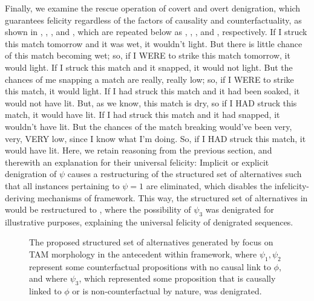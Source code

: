 Finally, we examine the rescue operation of covert and overt denigration, which guarantees felicity regardless of the factors of causality and counterfactuality, as shown in , , , and , which are repeated below as , , , and , respectively.
\pex
\a{}
    If I struck this match tomorrow and it was wet, it wouldn't light. But there is little chance of this match becoming wet; so, if I \MakeUppercase{were} to strike this match tomorrow, it would light.
\a{}If I struck this match and it snapped, it would not light. But the chances of me snapping a match are really, really low; so, if I \MakeUppercase{were} to strike this match, it would light.
\a{}If I had struck this match and it had been soaked, it would not have lit. But, as we know, this match is dry, so if I \MakeUppercase{had} struck this match, it would have lit.
\a{}If I had struck this match and it had snapped, it wouldn't have lit. But the chances of the match breaking would've been very, very, \MakeUppercase{very} low, since I know what I'm doing. So, if I \MakeUppercase{had} struck this match, it would have lit.
\xe
Here, we retain  reasoning from the previous section, and therewith an explanation for their universal felicity: Implicit or explicit denigration of $\psi$ causes a restructuring of the structured set of alternatives such that all instances pertaining to $\psi=1$ are eliminated, which disables the infelicity-deriving mechanisms of  framework. This way, the structured set of alternatives in  would be restructured to , where the possibility of $\psi_3$ was denigrated for illustrative purposes, explaining the universal felicity of denigrated sequences.
\begin{figure}[!htb]
    \centering
    
    \caption{The proposed structured set of alternatives generated by focus on TAM morphology in the antecedent within  framework, where $\psi_1,\psi_2$ represent some counterfactual propositions with no causal link to $\phi$, and where $\psi_3$, which represented some proposition that is causally linked to $\phi$ or is non-counterfactual by nature, was denigrated.}
\end{figure}

